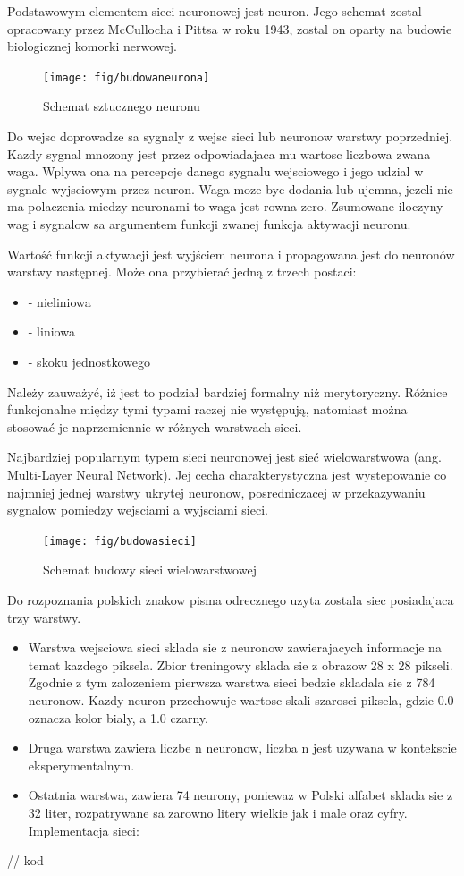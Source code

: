 \documentclass[brudnopis]{xmgr}
\begin{document}
Podstawowym elementem sieci neuronowej jest neuron. Jego schemat zostal opracowany przez McCullocha i Pittsa w roku 1943, zostal on oparty na budowie biologicznej komorki nerwowej.

\begin{figure}[!tbh]
\centering
\texttt{[image: fig/budowaneurona]}
\caption{Schemat sztucznego neuronu}
\end{figure}
\newpage

Do wejsc doprowadze sa sygnaly z wejsc sieci lub neuronow warstwy poprzedniej. Kazdy sygnal mnozony jest przez odpowiadajaca mu wartosc liczbowa zwana waga. Wplywa ona na percepcje danego sygnalu wejsciowego i jego udzial w sygnale wyjsciowym przez neuron. Waga moze byc dodania lub ujemna, jezeli nie ma polaczenia miedzy neuronami to waga jest rowna zero. Zsumowane iloczyny wag i sygnalow sa argumentem funkcji zwanej funkcja aktywacji neuronu.

Wartość funkcji aktywacji jest wyjściem neurona i propagowana jest do neuronów warstwy następnej. Może ona przybierać jedną z trzech postaci:
\begin{itemize}
\item
- nieliniowa
\item
- liniowa
\item
- skoku jednostkowego
\end{itemize}

Należy zauważyć, iż jest to podział bardziej formalny niż merytoryczny. Różnice funkcjonalne między tymi typami raczej nie występują, natomiast można stosować je naprzemiennie w różnych warstwach sieci.

Najbardziej popularnym typem sieci neuronowej jest sieć wielowarstwowa (ang. Multi-Layer Neural Network). Jej cecha charakterystyczna jest wystepowanie co najmniej jednej warstwy ukrytej neuronow, posredniczacej w przekazywaniu sygnalow pomiedzy wejsciami a wyjsciami sieci.

\begin{figure}[!tbh]
\centering
\texttt{[image: fig/budowasieci]}
\caption{Schemat budowy sieci wielowarstwowej}
\end{figure}
\newpage

Do rozpoznania polskich znakow pisma odrecznego uzyta zostala siec posiadajaca trzy warstwy.

\begin{itemize}
\item
Warstwa wejsciowa sieci sklada sie z neuronow zawierajacych informacje na temat kazdego piksela. Zbior treningowy sklada sie z obrazow 28 x 28 pikseli. Zgodnie z tym zalozeniem pierwsza warstwa sieci bedzie skladala sie z 784 neuronow. Kazdy neuron przechowuje wartosc skali szarosci piksela, gdzie 0.0 oznacza kolor bialy, a 1.0 czarny.
\item
Druga warstwa zawiera liczbe n neuronow, liczba n jest uzywana w kontekscie eksperymentalnym.
\item
Ostatnia warstwa, zawiera 74 neurony, poniewaz w Polski alfabet sklada sie z 32 liter, rozpatrywane sa zarowno litery wielkie jak i male oraz cyfry. Implementacja sieci:
\end{itemize}
// kod
\end{document}
